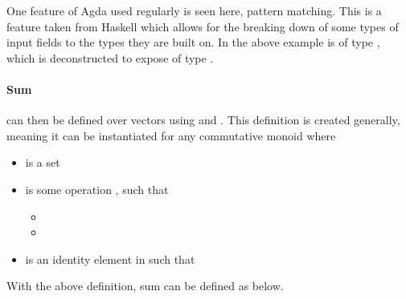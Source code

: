 One feature of Agda used regularly is seen here, pattern matching.
This is a feature taken from Haskell \cite{Norell2007}
which allows for the breaking down of some types of input fields to the 
types they are built on. 
In the above example  is of type , 
which is deconstructed to expose  of type .

\paragraph{Sum} can then be defined over vectors using  
and .
This definition is created generally, meaning it can be instantiated for any
commutative monoid  where 
\begin{itemize}
  \item {} is a set
  \item {} is some operation , such that 
  \begin{itemize}
      \item {}
      \item {}
  \end{itemize}
  \item {} is an identity element in  such that 
\end{itemize}
With the above definition, sum can be defined as below.
